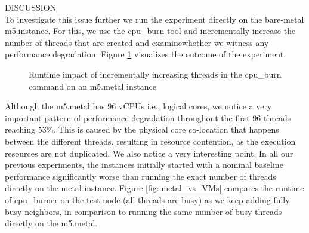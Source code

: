 DISCUSSION \\
To investigate this issue further we run the experiment directly on the bare-metal m5.instance. 
For this, we use the cpu\_burn tool and incrementally increase the number of threads that are created 
and examinewhether we witness any performance degradation. Figure \ref{fig::m5_metal} visualizes 
the outcome of the experiment. 
\begin{figure}[H]
\centering
{}
\caption{Runtime impact of incrementally increasing threads in the cpu\_burn command on an m5.metal instance} 
\label{fig::m5_metal}
\end{figure}
\noindent
Although the m5.metal has 96 vCPUs i.e., logical cores, we 
notice a very important pattern of performance degradation throughout the first 96 threads reaching 53\%. 
This is caused by the physical core co-location that happens between the different 
threads, resulting in resource contention, as the execution resources are not duplicated. 
We also notice a very interesting point. In all our previous experiments, the instances 
initially started with a nominal baseline performance significantly worse than running the 
exact number of threads directly on the metal instance. Figure \ref{fig::metal_vs_VMs} compares 
the runtime of cpu\_burner on the test node (all threads are busy) as we keep adding fully busy 
neighbors, in comparison to running the same number of busy threads directly on the m5.metal. 
